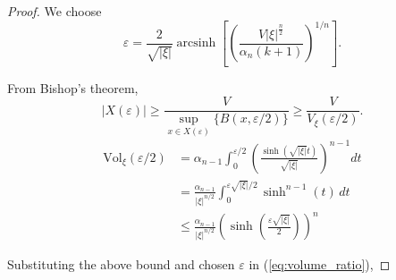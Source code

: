 \documentclass[10pt,a4paper]{amsart}
\begin{document}
\begin{proof}
We choose \[\varepsilon
=
\frac{2}{\sqrt{|\xi|}}\operatorname{arcsinh}\left[\left(\frac{ V|\xi|^\frac{n}{2}}{\alpha_n(k+1)}\right)^{1/n}\right].
\]  

From Bishop's theorem, 
\begin{equation}
\label{eq:volume_ratio}
  |X(\varepsilon)|\ge \frac{V}{\sup_{x\in X(\varepsilon)}\{B(x,\varepsilon/2)\}}\ge \frac{V}{V_{\xi}(\varepsilon/2)}.  
\end{equation}
\begin{align}
\mathrm{Vol}_{\xi}(\varepsilon/2)
&=
\alpha_{n-1}
\int_{0}^{\varepsilon/2}
\left(
\frac{\sinh(\sqrt{|\xi|}t)}{\sqrt{|\xi|}}
\right)^{n-1}
dt \nonumber\\
&=
\frac{\alpha_{n-1}}{|\xi|^{n/2}}
\int_0^{\varepsilon \sqrt{|\xi|}/2}
\sinh^{n-1}(t)\,dt \nonumber\\
&\le
\frac{\alpha_{n-1}}{|\xi|^{n/2}}
\left(
\sinh\left(\frac{\varepsilon \sqrt{|\xi|}}{2}\right)
\right)^n \nonumber
\end{align}

Substituting the above bound and chosen $\varepsilon$ in (\ref{eq:volume_ratio}),


\end{proof}
\end{document}
